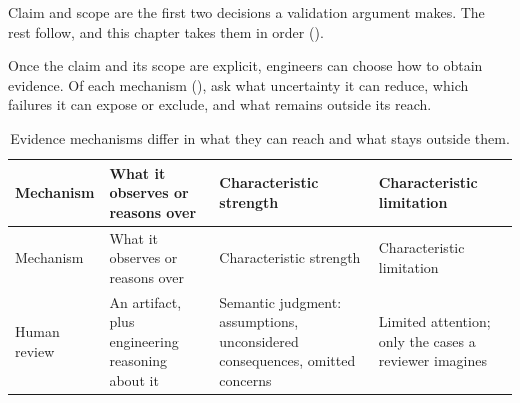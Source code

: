 Claim and scope are the first two decisions a validation argument makes. The rest follow, and this
chapter takes them in order (\citet{tbl-validation-skeleton}).

Once the claim and its scope are explicit, engineers can choose how to obtain evidence. Of each
mechanism (\citet{tbl-evidence-mechanisms}), ask what uncertainty it can reduce, which failures it can
expose or exclude, and what remains outside its reach.

\begin{longtable}[]{@{}
  >{\raggedright\arraybackslash}p{}
  >{\raggedright\arraybackslash}p{}
  >{\raggedright\arraybackslash}p{}
  >{\raggedright\arraybackslash}p{}@{}}
\caption{Evidence mechanisms differ in what they can reach and what stays outside them.}\label{tbl-evidence-mechanisms}\tabularnewline
\toprule\noalign{}
\begin{minipage}[b]{\linewidth}\raggedright
Mechanism
\end{minipage} & \begin{minipage}[b]{\linewidth}\raggedright
What it observes or reasons over
\end{minipage} & \begin{minipage}[b]{\linewidth}\raggedright
Characteristic strength
\end{minipage} & \begin{minipage}[b]{\linewidth}\raggedright
Characteristic limitation
\end{minipage} \\
\midrule\noalign{}
\endfirsthead
\toprule\noalign{}
\begin{minipage}[b]{\linewidth}\raggedright
Mechanism
\end{minipage} & \begin{minipage}[b]{\linewidth}\raggedright
What it observes or reasons over
\end{minipage} & \begin{minipage}[b]{\linewidth}\raggedright
Characteristic strength
\end{minipage} & \begin{minipage}[b]{\linewidth}\raggedright
Characteristic limitation
\end{minipage} \\
\midrule\noalign{}
\endhead
\bottomrule\noalign{}
\endlastfoot
Human review & An artifact, plus engineering reasoning about it & Semantic judgment: assumptions, unconsidered consequences, omitted concerns & Limited attention; only the cases a reviewer imagines \\

\end{longtable}
